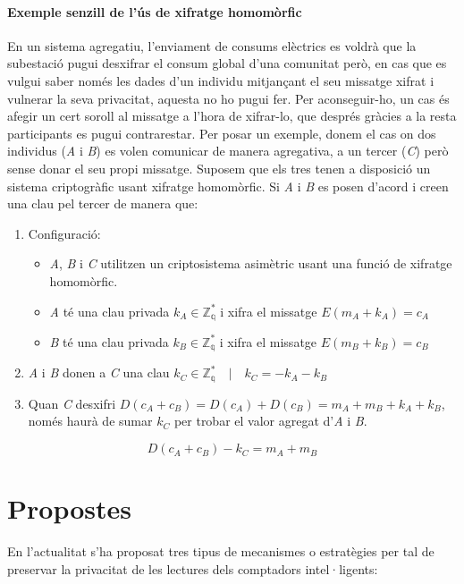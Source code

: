 \documentclass{article}
\begin{document}
\subsection{Exemple senzill de l'ús de xifratge homomòrfic}\label{subsec:homomorfism-exemple}
En un sistema agregatiu, l'enviament de consums elèctrics es voldrà que la subestació pugui desxifrar el consum global d'una comunitat però, en cas que es vulgui saber només les dades d'un individu mitjançant el seu missatge xifrat i vulnerar la seva privacitat, aquesta no ho pugui fer. Per aconseguir-ho, un cas és afegir un cert soroll al missatge a l'hora de xifrar-lo, que després gràcies a la resta participants es pugui contrarestar. Per posar un exemple, donem el cas on dos individus (\textit{A} i \textit{B}) es volen comunicar de manera agregativa, a un tercer (\textit{C}) però sense donar el seu propi missatge. Suposem que els tres tenen a disposició un sistema criptogràfic usant xifratge homomòrfic. Si \textit{A} i \textit{B} es posen d'acord i creen una clau pel tercer de manera que:
\begin{enumerate}
	\item Configuració:
	\begin{itemize}
		\item \textit{A}, \textit{B} i \textit{C} utilitzen un criptosistema asimètric usant una funció de xifratge homomòrfic.
		\item \textit{A} té una clau privada $k_A \in \mathbb{Z_q^*}$ i xifra el missatge $E(m_A + k_A) = c_A$
		\item \textit{B} té una clau privada $k_B \in \mathbb{Z_q^*}$  i xifra el missatge $E(m_B + k_B) = c_B$
	\end{itemize}
	\item \textit{A} i \textit{B} donen a \textit{C} una clau $k_C \in \mathbb{Z_q^*} \quad | \quad k_C = - k_A - k_B$
	\item Quan \textit{C} desxifri $D(c_A + c_B) = D(c_A) + D(c_B) = m_A + m_B + k_A + k_B$, només haurà de sumar $k_C$ per trobar el valor agregat d'\textit{A} i \textit{B}.
\end{enumerate}
\[D(c_A + c_B) - k_C = m_A + m_B\]
\newpage\part{Propostes}\label{part:propostes}
En l'actualitat s'ha proposat tres tipus de mecanismes o estratègies per tal de preservar la privacitat de les lectures dels comptadors intel·ligents:
\end{document}
